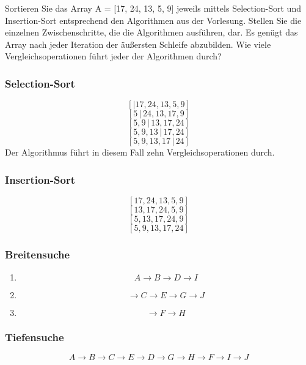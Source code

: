 \documentclass[a4paper, 12pt, margins=3cm]{homework}
\begin{document}
  \begin{problem}
    Sortieren Sie das Array A = [17, 24, 13, 5, 9] jeweils mittels Selection-Sort
    und Insertion-Sort entsprechend den Algorithmen aus der Vorlesung. Stellen Sie 
    die einzelnen Zwischenschritte, die die Algorithmen ausführen, dar. Es genügt das Array nach
    jeder Iteration der äußersten Schleife abzubilden. Wie viele Vergleichsoperationen führt
    jeder der Algorithmen durch?
  \end{problem}
  \begin{solution}\hfill
    \subsubsection*{Selection-Sort}
      \[ [|17, 24, 13, 5, 9] \]
      \[ [5\,|\, 24, 13, 17, 9] \]
      \[ [5, 9\,|\, 13, 17, 24] \]
      \[ [5, 9, 13\,|\, 17, 24] \]
      \[ [5, 9, 13, 17\,|\, 24] \]
      Der Algorithmus führt in diesem Fall zehn Vergleichsoperationen durch.

    \subsubsection*{Insertion-Sort}
      \[ [17, 24, 13, 5, 9] \]
      \[ [13, 17, 24, 5, 9] \]
      \[ [5, 13, 17, 24, 9] \]
      \[ [5, 9, 13, 17, 24] \]


  \end{solution}

\newpage

  \begin{problem}
    
  \end{problem}
  \begin{solution}\hfill

    \subsubsection*{Breitensuche}
      \begin{enumerate}
        \item \[ A\rightarrow B\rightarrow D\rightarrow I \]
        \item \[ \rightarrow C\rightarrow E\rightarrow G\rightarrow J \]
        \item \[ \rightarrow F\rightarrow H \]
      \end{enumerate}

    \subsubsection*{Tiefensuche}
        \[ A\rightarrow B\rightarrow C\rightarrow E\rightarrow D\rightarrow G\rightarrow H\rightarrow
                 F\rightarrow I\rightarrow J \]

  \end{solution}
\end{document}
